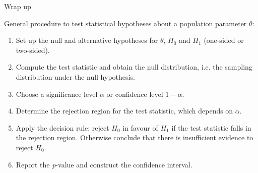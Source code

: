 \documentclass{beamer}
\begin{document}
\begin{frame}{Wrap up}

        General procedure to test statistical hypotheses about a
        population parameter $\theta$:
        \begin{enumerate}
                \item Set up the null and alternative hypotheses for $\theta$, $H_0$ and $H_1$ 
		(one-sided or two-sided).
                \pause
                \item Compute the test statistic and obtain the null distribution, i.e. the
                sampling distribution under the null hypothesis.
                \pause
                \item Choose a significance level $\alpha$ or confidence level $1 - \alpha$.
                \pause
                \item Determine the rejection region for the test statistic, which depends
                on $\alpha$.
                \pause
                \item Apply the decision rule: reject $H_0$ in favour of $H_1$ if the test statistic
                falls in the rejection region. Otherwise conclude that there is
                insufficient evidence to reject $H_0$.
                \pause
                \item Report the \textit{p}-value and construct the confidence interval.
        \end{enumerate}

\end{frame}
\end{document}
